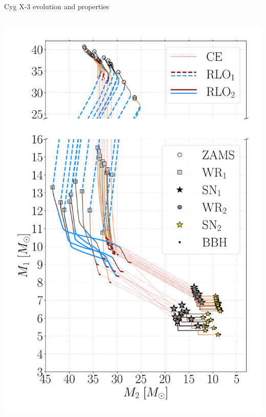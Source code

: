 \documentclass{beamer} %
\begin{document}
\begin{frame}{Cyg X-3 evolution and properties}
\begin{columns}
		\begin{column}{0.5\textwidth}
			\centering
			\includegraphics[width=\textwidth]{./images/com_Mass_1_Mass_0_BHBH_GW_WRBH_cyg_x-3--Ko17.pdf}
		\end{column}
	\end{columns}
\end{frame}
\end{document}
